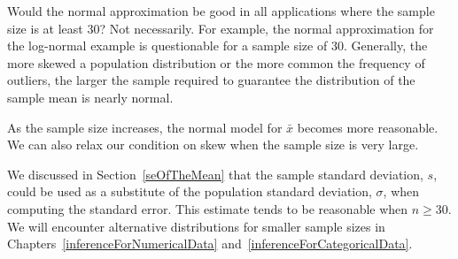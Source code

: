 \begin{example}{Would the normal approximation be good in all applications where the sample size is at least 30?}
Not necessarily. For example, the normal approximation for the log-normal example is questionable for a sample size of 30. Generally, the more skewed a population distribution or the more common the frequency of outliers, the larger the sample required to guarantee the distribution of the sample mean is nearly normal.
\end{example}

\begin{tipBox}{
As the sample size increases, the normal model for $\bar{x}$ becomes more reasonable. We can also relax our condition on skew when the sample size is very large.}
\end{tipBox}

We discussed in Section~\ref{seOfTheMean} that the sample standard deviation, $s$, could be used as a substitute of the population standard deviation, $\sigma$, when computing the standard error. This estimate tends to be reasonable when $n\geq30$. We will encounter alternative distributions for smaller sample sizes in Chapters~\ref{inferenceForNumericalData} and~\ref{inferenceForCategoricalData}.



